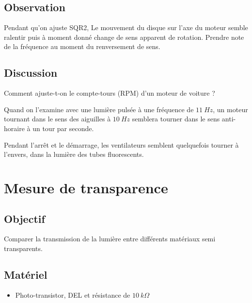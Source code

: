 \documentclass{book}
\begin{document}
\subsection{Observation}


Pendant qu'on ajuste SQR2, Le mouvement du disque sur l'axe du moteur semble ralentir puis à moment donné change de sens apparent de rotation. Prendre note de la fréquence au moment du renversement de sens.

\subsection{Discussion}


Comment ajuste-t-on le compte-tours (RPM) d'un moteur de voiture ?



Quand on l'examine avec une lumière pulsée à une fréquence de $11\ Hz$, un moteur tournant dans le sens des aiguilles à $10\ Hz$ semblera tourner dans le sens anti-horaire à un tour par seconde.



Pendant l'arrêt et le démarrage, les ventilateurs semblent quelquefois tourner à l'envers, dans la lumière des tubes fluorescents.







\section{Mesure de transparence}



\subsection{Objectif}


Comparer la transmission de la lumière entre différents matériaux semi transparents.




\subsection{Matériel}


\begin{itemize}
  \item Photo-transistor, DEL et résistance de $10\ k\Omega$
\end{itemize}
\end{document}
